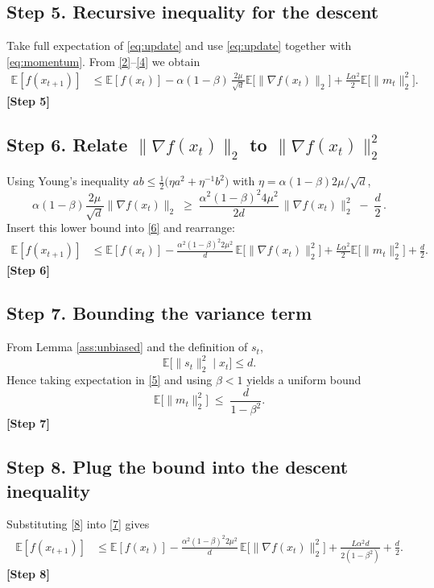 \documentclass{article}
\newcommand{\E}{\mathbb{E}}
\begin{document}
\subsection*{Step 5. Recursive inequality for the descent}
Take full expectation of \eqref{eq:update} and use \eqref{eq:update} together with \eqref{eq:momentum}.  
From \eqref{2}–\eqref{4} we obtain
\begin{align}
\E[f(x_{t+1})]
&\le \E[f(x_t)] -\alpha(1-\beta)\,\frac{2\mu}{\sqrt{d}}\E\!\bigl[\|\nabla f(x_t)\|_{2}\bigr]
   +\frac{L\alpha^{2}}{2}\E\!\bigl[\|m_t\|_{2}^{2}\bigr] .
\tag{6}
\end{align}
\textbf{[Step 5]}

\subsection*{Step 6. Relate $\|\nabla f(x_t)\|_{2}$ to $\|\nabla f(x_t)\|_{2}^{2}$}
Using Young’s inequality $ab\le \tfrac{1}{2}\bigl(\eta a^{2}+ \eta^{-1}b^{2}\bigr)$ with $\eta=\alpha(1-\beta)2\mu/\sqrt{d}$,
\[
\alpha(1-\beta)\frac{2\mu}{\sqrt{d}}\|\nabla f(x_t)\|_{2}
\;\ge\;
\frac{\alpha^{2}(1-\beta)^{2}4\mu^{2}}{2d}\,\|\nabla f(x_t)\|_{2}^{2}
\;-\;
\frac{d}{2}\, .
\]
Insert this lower bound into \eqref{6} and rearrange:
\begin{align}
\E[f(x_{t+1})]
&\le \E[f(x_t)]
   -\frac{\alpha^{2}(1-\beta)^{2}2\mu^{2}}{d}\,\E\!\bigl[\|\nabla f(x_t)\|_{2}^{2}\bigr]
   +\frac{L\alpha^{2}}{2}\E\!\bigl[\|m_t\|_{2}^{2}\bigr]
   +\frac{d}{2}. \tag{7}
\end{align}
\textbf{[Step 6]}

\subsection*{Step 7. Bounding the variance term}
From Lemma \ref{ass:unbiased} and the definition of $s_t$,
\[
\E\!\bigl[\|s_t\|_{2}^{2}\mid x_t\bigr]\le d .
\]
Hence taking expectation in \eqref{5} and using $\beta<1$ yields a uniform bound
\[
\E\!\bigl[\|m_t\|_{2}^{2}\bigr]\;\le\; \frac{d}{1-\beta^{2}} . \tag{8}
\]
\textbf{[Step 7]}

\subsection*{Step 8. Plug the bound into the descent inequality}
Substituting \eqref{8} into \eqref{7} gives
\begin{align}
\E[f(x_{t+1})]
&\le \E[f(x_t)]
   -\frac{\alpha^{2}(1-\beta)^{2}2\mu^{2}}{d}\,\E\!\bigl[\|\nabla f(x_t)\|_{2}^{2}\bigr]
   +\frac{L\alpha^{2}d}{2(1-\beta^{2})}
   +\frac{d}{2}. \tag{9}
\end{align}
\textbf{[Step 8]}
\end{document}
